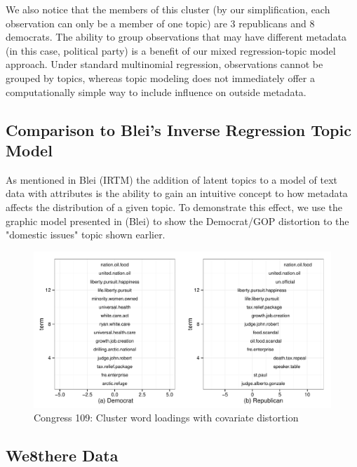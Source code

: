 \documentclass[12pt]{article}
\begin{document}
We also notice that the members of this cluster (by our simplification, each observation can only be a member of one topic) are 3 republicans and 8 democrats. 
The ability to group observations that may have different metadata (in this case, political party) is a benefit of our mixed regression-topic model approach. 
Under standard multinomial regression, observations cannot be grouped by topics, whereas topic modeling does not immediately offer a computationally simple way to include influence on outside metadata.

\subsection{Comparison to Blei's Inverse Regression Topic Model}
As mentioned in Blei (IRTM) the addition of latent topics to a model of text data with attributes is the ability to gain an intuitive concept to how metadata affects the distribution of a given topic. 
To demonstrate this effect, we use the graphic model presented in (Blei) to show the Democrat/GOP distortion to the "domestic issues"  topic shown earlier. 

\begin{figure}[!htpb]
  \centering
\caption[Loadings]{Congress 109: Cluster word loadings with covariate distortion}
  \includegraphics[width=6.2in]{Images/Blei_Changing_Loadings_GOP.pdf}
\end{figure}


\subsection{We8there Data}
\end{document}
